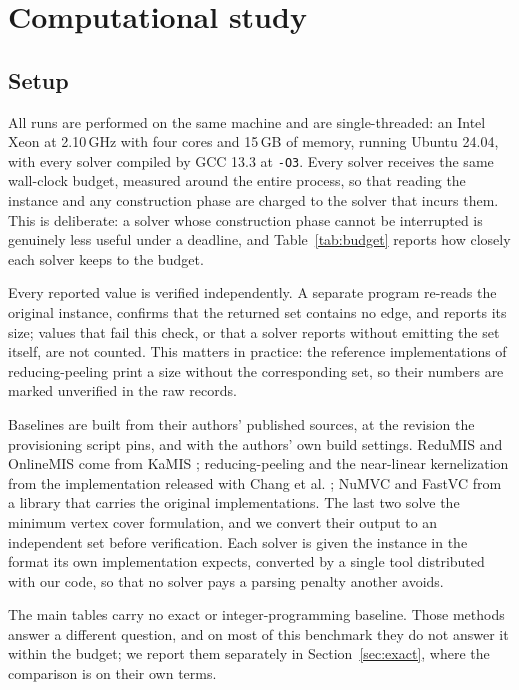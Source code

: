 \documentclass[preprint,12pt]{elsarticle}
\theoremstyle{definition}
\begin{document}
\section{Computational study}
\label{sec:experiments}

\subsection{Setup}

All runs are performed on the same machine and are single-threaded: an Intel
Xeon at 2.10\,GHz with four cores and 15\,GB of memory, running Ubuntu 24.04,
with every solver compiled by GCC 13.3 at \texttt{-O3}. Every solver
receives the same wall-clock budget, measured around the entire process, so that
reading the instance and any construction phase are charged to the solver that
incurs them. This is deliberate: a solver whose construction phase cannot be
interrupted is genuinely less useful under a deadline, and
Table~\ref{tab:budget} reports how closely each solver keeps to the budget.

Every reported value is verified independently. A separate program re-reads the
original instance, confirms that the returned set contains no edge, and reports
its size; values that fail this check, or that a solver reports without emitting
the set itself, are not counted. This matters in practice: the reference
implementations of reducing-peeling print a size without the corresponding set,
so their numbers are marked unverified in the raw records.

Baselines are built from their authors' published sources, at the revision the
provisioning script pins, and with the authors' own build settings. ReduMIS and
OnlineMIS come from KaMIS \cite{lamm2017,dahlum2016}; reducing-peeling and the
near-linear kernelization from the implementation released with
Chang et al. \cite{chang2017}; NuMVC \cite{cai2013numvc} and FastVC
\cite{cai2017fastvc} from a library that carries the original implementations.
The last two solve the minimum vertex cover formulation, and we convert their
output to an independent set before verification. Each solver is given the
instance in the format its own implementation expects, converted by a single
tool distributed with our code, so that no solver pays a parsing penalty another
avoids.

The main tables carry no exact or integer-programming baseline. Those methods
answer a different question, and on most of this benchmark they do not answer it
within the budget; we report them separately in Section~\ref{sec:exact}, where
the comparison is on their own terms.
\end{document}
